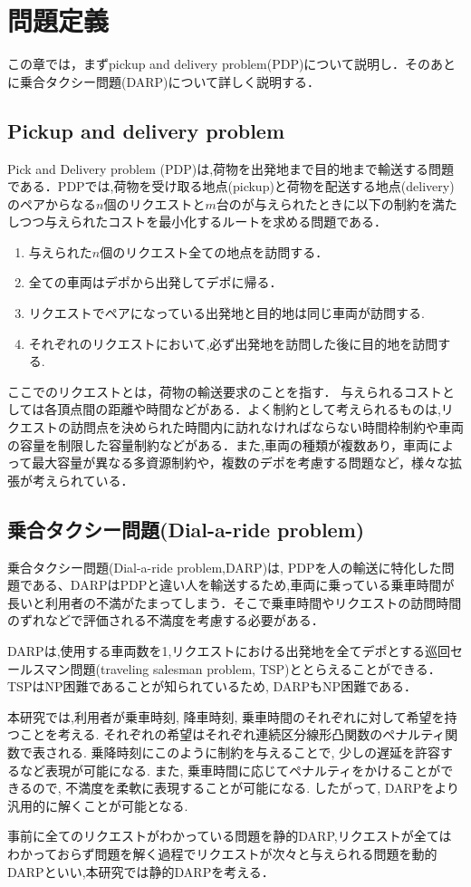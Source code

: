 \chapter{問題定義}\label{definition}
この章では，まずpickup and delivery problem(PDP)について説明し．そのあとに乗合タクシー問題(DARP)について詳しく説明する．
\section{Pickup and delivery problem}
Pick and Delivery problem (PDP)は,荷物を出発地まで目的地まで輸送する問題である．PDPでは,荷物を受け取る地点(pickup)と荷物を配送する地点(delivery)のペアからなる$n$個のリクエストと$m$台のが与えられたときに以下の制約を満たしつつ与えられたコストを最小化するルートを求める問題である．
\begin{enumerate}
 \item 与えられた$n$個のリクエスト全ての地点を訪問する．
 \item 全ての車両はデポから出発してデポに帰る．
 \item リクエストでペアになっている出発地と目的地は同じ車両が訪問する.
 \item それぞれのリクエストにおいて,必ず出発地を訪問した後に目的地を訪問する.
\end{enumerate}
ここでのリクエストとは，荷物の輸送要求のことを指す．
与えられるコストとしては各頂点間の距離や時間などがある．よく制約として考えられるものは,リクエストの訪問点を決められた時間内に訪れなければならない時間枠制約や車両の容量を制限した容量制約などがある．また,車両の種類が複数あり，車両によって最大容量が異なる多資源制約や，複数のデポを考慮する問題など，様々な拡張が考えられている．

\section{乗合タクシー問題(Dial-a-ride problem)}
乗合タクシー問題(Dial-a-ride problem,DARP)は, PDPを人の輸送に特化した問題である、DARPはPDPと違い人を輸送するため,車両に乗っている乗車時間が長いと利用者の不満がたまってしまう．そこで乗車時間やリクエストの訪問時間のずれなどで評価される不満度を考慮する必要がある．

DARPは,使用する車両数を1,リクエストにおける出発地を全てデポとする巡回セールスマン問題(traveling salesman problem, TSP)ととらえることができる．TSPはNP困難\cite{TSP}であることが知られているため, DARPもNP困難である．

本研究では,利用者が乗車時刻, 降車時刻, 乗車時間のそれぞれに対して希望を持つことを考える. それぞれの希望はそれぞれ連続区分線形凸関数のペナルティ関数で表される. 乗降時刻にこのように制約を与えることで, 少しの遅延を許容するなど表現が可能になる. また, 乗車時間に応じてペナルティをかけることができるので, 不満度を柔軟に表現することが可能になる. したがって, DARPをより汎用的に解くことが可能となる.

事前に全てのリクエストがわかっている問題を静的DARP,リクエストが全てはわかっておらず問題を解く過程でリクエストが次々と与えられる問題を動的DARPといい,本研究では静的DARPを考える．
